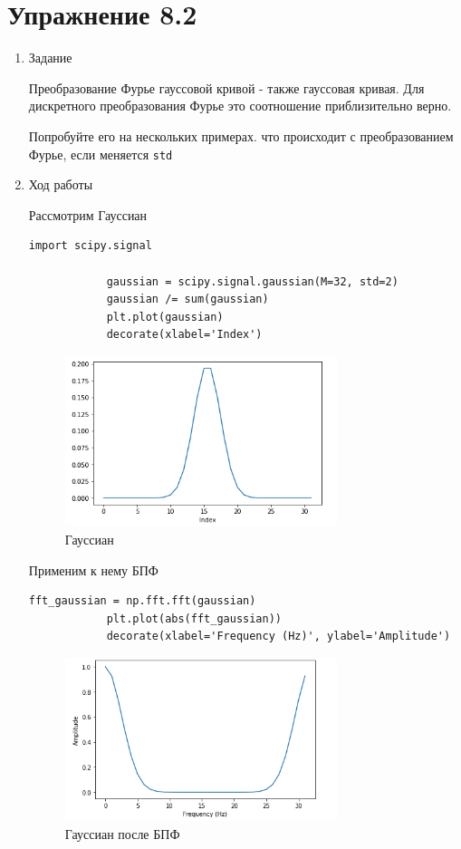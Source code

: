 \documentclass[a4paper,12pt]{article}
\begin{document}
	\section{Упражнение 8.2}

	\begin{enumerate}
		
		\item{Задание}
		
		Преобразование Фурье гауссовой кривой - также гауссовая кривая. Для дискретного преобразования Фурье это соотношение приблизительно верно.
		
		Попробуйте его на нескольких примерах. что происходит с преобразованием Фурье, если меняется \texttt{std}
		
		\item{Ход работы}
		
		Рассмотрим Гауссиан
		
		\begin{lstlisting}[caption=Построение Гауссиана]
			import scipy.signal
			
			gaussian = scipy.signal.gaussian(M=32, std=2)
			gaussian /= sum(gaussian)
			plt.plot(gaussian)
			decorate(xlabel='Index')
		\end{lstlisting}
		\begin{figure}[H]
			\centering
			\includegraphics[width=0.75\textwidth]{2_1.png}
			\caption{Гауссиан}
			\label{fig:2.1}
		\end{figure}
		
		Применим к нему БПФ
		\begin{lstlisting}[caption=Построение Гауссиана]
			fft_gaussian = np.fft.fft(gaussian)
			plt.plot(abs(fft_gaussian))
			decorate(xlabel='Frequency (Hz)', ylabel='Amplitude')
		\end{lstlisting}
		\begin{figure}[H]
			\centering
			\includegraphics[width=0.75\textwidth]{2_2.png}
			\caption{Гауссиан после БПФ}
			\label{fig:2.2}
		\end{figure}
		

\end{enumerate}
\end{document}
